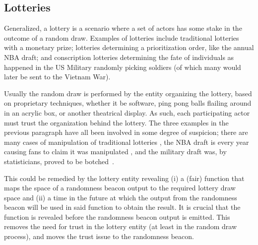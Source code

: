 \subsection{Lotteries}\label{subsec:usecase_lotteries}
Generalized, a lottery is a scenario where a set of actors has some stake in the outcome of a random draw. Examples of lotteries include traditional lotteries with a monetary prize; lotteries determining a prioritization order, like the annual NBA draft; and conscription lotteries determining the fate of individuals as happened in the US Military randomly picking soldiers (of which many would later be sent to the Vietnam War).

Usually the random draw is performed by the entity organizing the lottery, based on proprietary techniques, whether it be software, ping pong balls flailing around in an acrylic box, or another theatrical display. As such, each participating actor must trust the organization behind the lottery. The three examples in the previous paragraph have all been involved in some degree of suspicion; there are many cases of manipulation of traditional lotteries , the NBA draft is every year causing fans to claim it was manipulated , and the military draft was, by statisticians, proved to be botched~\cite{starr1997nonrandom}.

This could be remedied by the lottery entity revealing (i) a (fair) function that maps the space of a randomness beacon output to the required lottery draw space and (ii) a time in the future at which the output from the randomness beacon will be used in said function to obtain the result. It is crucial that the function is revealed before the randomness beacon output is emitted. This removes the need for trust in the lottery entity (at least in the random draw process), and moves the trust issue to the randomness beacon.

